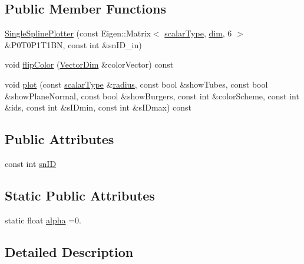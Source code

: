 \subsection*{Public Member Functions}
\begin{DoxyCompactItemize}
\item 
\hyperlink{classmodel_1_1_single_spline_plotter_ab443242a355214a5abe4326dd766ed52}{Single\+Spline\+Plotter} (const Eigen\+::\+Matrix$<$ \hyperlink{classmodel_1_1_single_spline_plotter_aa7a9de72b38d4d60ca52a5b62570e45a}{scalar\+Type}, \hyperlink{plot_nd_a_8m_a382f3ca768b275b8d563604f7fc7df73}{dim}, 6 $>$ \&P0\+T0\+P1\+T1\+B\+N, const int \&sn\+I\+D\+\_\+in)
\item 
void \hyperlink{classmodel_1_1_single_spline_plotter_a190d0b2ab7be3c902af6464f5c510a34}{flip\+Color} (\hyperlink{classmodel_1_1_single_spline_plotter_aac0dc9b9bcd8a574fab46652cc669602}{Vector\+Dim} \&color\+Vector) const 
\item 
void \hyperlink{classmodel_1_1_single_spline_plotter_a709bf94ceabfd5cbfd090b89d0ce1f71}{plot} (const \hyperlink{classmodel_1_1_single_spline_plotter_aa7a9de72b38d4d60ca52a5b62570e45a}{scalar\+Type} \&\hyperlink{tube_plotter_8m_acc620a89e606f875661525fd6365a421}{radius}, const bool \&show\+Tubes, const bool \&show\+Plane\+Normal, const bool \&show\+Burgers, const int \&color\+Scheme, const int \&ids, const int \&s\+I\+Dmin, const int \&s\+I\+Dmax) const 
\end{DoxyCompactItemize}
\subsection*{Public Attributes}
\begin{DoxyCompactItemize}
\item 
const int \hyperlink{classmodel_1_1_single_spline_plotter_ae255b98f097fad73ff25f224c491b6fc}{sn\+I\+D}
\end{DoxyCompactItemize}
\subsection*{Static Public Attributes}
\begin{DoxyCompactItemize}
\item 
static float \hyperlink{classmodel_1_1_single_spline_plotter_a67ef7174e0b12283c38573a8c49e2ef3}{alpha} =0.
\end{DoxyCompactItemize}


\subsection{Detailed Description}
